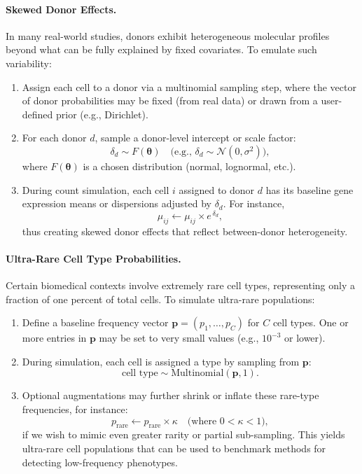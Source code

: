 \documentclass{article}
\begin{document}
\paragraph{Skewed Donor Effects.}
In many real-world studies, donors exhibit heterogeneous molecular profiles beyond what can be fully explained by fixed covariates. To emulate such variability:
\begin{enumerate}
	\item Assign each cell to a donor via a multinomial sampling step, where the vector of donor probabilities may be fixed (from real data) or drawn from a user-defined prior (e.g., Dirichlet).
	\item For each donor $d$, sample a donor-level intercept or scale factor:
	\[
	\delta_d \sim F(\boldsymbol{\theta}) \quad\text{(e.g., }\delta_d \sim \mathcal{N}(0,\sigma^2)\text{)},
	\]
	where $F(\boldsymbol{\theta})$ is a chosen distribution (normal, lognormal, etc.).
	\item During count simulation, each cell $i$ assigned to donor $d$ has its baseline gene expression means or dispersions adjusted by $\delta_d$. For instance,
	\[
	\mu_{ij} \leftarrow \mu_{ij} \times e^{\,\delta_d},
	\]
	thus creating skewed donor effects that reflect between-donor heterogeneity.
\end{enumerate}

\paragraph{Ultra-Rare Cell Type Probabilities.}
Certain biomedical contexts involve extremely rare cell types, representing only a fraction of one percent of total cells. To simulate ultra-rare populations:
\begin{enumerate}
	\item Define a baseline frequency vector $\mathbf{p} = (p_1, \ldots, p_C)$ for $C$ cell types. One or more entries in $\mathbf{p}$ may be set to very small values (e.g., $10^{-3}$ or lower).
	\item During simulation, each cell is assigned a type by sampling from $\mathbf{p}$:
	\[
	\text{cell type} \sim \text{Multinomial}(\mathbf{p},1).
	\]
	\item Optional augmentations may further shrink or inflate these rare-type frequencies, for instance:
	\[
	p_{\text{rare}} \leftarrow p_{\text{rare}} \times \kappa \quad\text{(where }0 < \kappa < 1\text{)},
	\]
	if we wish to mimic even greater rarity or partial sub-sampling. This yields ultra-rare cell populations that can be used to benchmark methods for detecting low-frequency phenotypes.
\end{enumerate}
\end{document}
